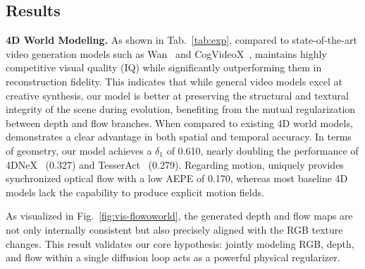 \subsection{Results}
\noindent 
\textbf{4D World Modeling.}
As shown in Tab.~\ref{tab:exp}, compared to state-of-the-art video generation models such as Wan~\citep{wang2025wan} and CogVideoX~\citep{yang2024cogvideox}, \our maintains highly competitive visual quality (IQ) while significantly outperforming them in reconstruction fidelity. This indicates that while general video models excel at creative synthesis, our model is better at preserving the structural and textural integrity of the scene during evolution, benefiting from the mutual regularization between depth and flow branches. When compared to existing 4D world models, \our demonstrates a clear advantage in both spatial and temporal accuracy. In terms of geometry, our model achieves a $\delta_1$ of 0.610, nearly doubling the performance of 4DNeX~\citep{chen20254dnex} (0.327) and TesserAct~\citep{zhen2025learning} (0.279). Regarding motion, \our uniquely provides synchronized optical flow with a low AEPE of 0.170, whereas most baseline 4D models lack the capability to produce explicit motion fields. 

As visualized in Fig.~\ref{fig:vis-flowoworld}, the generated depth and flow maps are not only internally consistent but also precisely aligned with the RGB texture changes. This result validates our core hypothesis: jointly modeling RGB, depth, and flow within a single diffusion loop acts as a powerful physical regularizer. 



